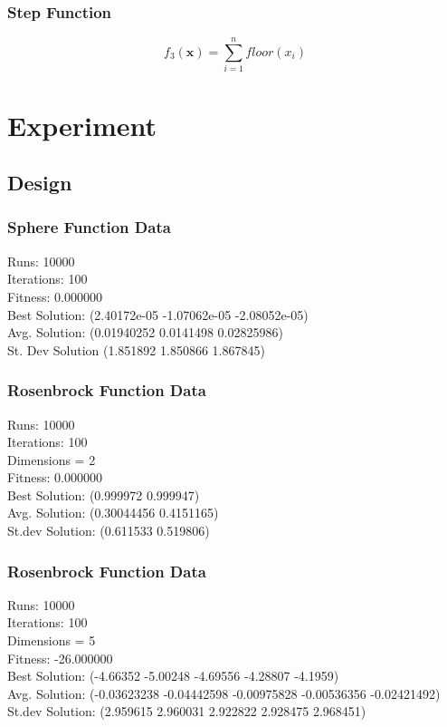 \documentclass{article}
\begin{document}
\subsubsection{Step Function}
$$f_3(\mathbf{x}) = \sum_{i=1}^{n} floor(x_i)$$

\section{Experiment}
\subsection{Design}
\subsubsection{Sphere Function Data}
Runs: 10000\\
Iterations: 100\\
Fitness: 0.000000\\
Best Solution: (2.40172e-05 -1.07062e-05 -2.08052e-05)\\
Avg. Solution: (0.01940252 0.0141498  0.02825986)\\
St. Dev Solution (1.851892 1.850866 1.867845)\\

\subsubsection{Rosenbrock Function Data}
Runs: 10000\\
Iterations: 100\\
Dimensions = 2\\
Fitness: 0.000000\\
Best Solution: (0.999972 0.999947)\\
Avg. Solution: (0.30044456 0.4151165)\\
St.dev Solution: (0.611533 0.519806)\\

\subsubsection{Rosenbrock Function Data}
Runs: 10000\\
Iterations: 100\\
Dimensions = 5\\
Fitness: -26.000000\\
Best Solution: (-4.66352 -5.00248 -4.69556 -4.28807 -4.1959)\\
Avg. Solution: (-0.03623238 -0.04442598 -0.00975828 -0.00536356 -0.02421492)\\
St.dev Solution: (2.959615 2.960031 2.922822 2.928475 2.968451)\\
\end{document}
